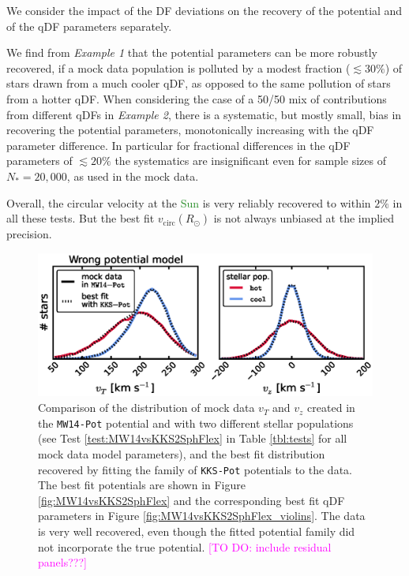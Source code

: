 \documentclass[iop,revtex4]{emulateapj}
\newcommand{\NEW}[1]{\textcolor{ForestGreen}{#1}}
\newcommand{\Wilma}[1]{\textcolor{Magenta}{#1}}
\newcommand{\OLD}[1]{}
\begin{document}
We consider the impact of the DF deviations on the recovery of the potential and of the qDF parameters separately. 

We find from \emph{Example 1} that the potential parameters can be more robustly recovered, if a mock data population is polluted by a modest fraction ($\lesssim 30\%$) of stars drawn from a much cooler qDF, as opposed to the same pollution of stars from a hotter qDF. When considering the case of a 50/50 mix of contributions from different qDFs in \emph{Example 2}, there is a systematic, but mostly small, bias in recovering the potential parameters, monotonically increasing with the qDF parameter difference. In particular for fractional differences in the qDF parameters of $\lesssim 20\%$ the systematics are insignificant even for sample sizes of $N_{*} = 20,000$, as used in the mock data.

Overall, the circular velocity at the \OLD{sun}\NEW{Sun} is very reliably recovered to within $2\%$ in all these tests. But the best fit $v_\text{circ}(R_\odot)$ is not always unbiased at the implied precision.

\begin{figure}[!htbp]
\centering
\includegraphics[width=\columnwidth]{figs/MW14vsKKS2SphFlex_mockdata_residuals_3.eps}
\caption{Comparison of the distribution of mock data $v_T$ and $v_z$ created in the \texttt{MW14-Pot} potential and with two different stellar populations (see Test \ref{test:MW14vsKKS2SphFlex} in Table \ref{tbl:tests} for all mock data model parameters), and the best fit distribution recovered by fitting the family of \texttt{KKS-Pot} potentials to the data. The best fit potentials are shown in Figure \ref{fig:MW14vsKKS2SphFlex} and the corresponding best fit qDF parameters in Figure \ref{fig:MW14vsKKS2SphFlex_violins}. The data is very well recovered, even though the fitted potential family did not incorporate the true potential. \Wilma{[TO DO: include residual panels???]}}
\label{fig:MW14vsKKS2SphFlex_mockdata_residuals}
\end{figure}
\end{document}
